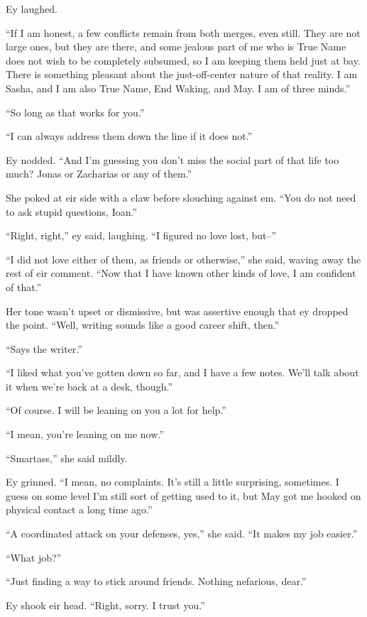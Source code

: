 Ey laughed.

``If I am honest, a few conflicts remain from both merges, even still. They are not large ones, but they are there, and some jealous part of me who is True Name does not wish to be completely subsumed, so I am keeping them held just at bay. There is something pleasant about the just-off-center nature of that reality. I am Sasha, and I am also True Name, End Waking, and May. I am of three minds.''

``So long as that works for you.''

``I can always address them down the line if it does not.''

Ey nodded. ``And I'm guessing you don't miss the social part of that life too much? Jonas or Zacharias or any of them.''

She poked at eir side with a claw before slouching against em. ``You do not need to ask stupid questions, Ioan.''

``Right, right,'' ey said, laughing. ``I figured no love lost, but--''

``I did not love either of them, as friends or otherwise,'' she said, waving away the rest of eir comment. ``Now that I have known other kinds of love, I am confident of that.''

Her tone wasn't upset or dismissive, but was assertive enough that ey dropped the point. ``Well, writing sounds like a good career shift, then.''

``Says the writer.''

``I liked what you've gotten down so far, and I have a few notes. We'll talk about it when we're back at a desk, though.''

``Of course. I will be leaning on you a lot for help.''

``I mean, you're leaning on me now.''

``Smartass,'' she said mildly.

Ey grinned. ``I mean, no complaints. It's still a little surprising, sometimes. I guess on some level I'm still sort of getting used to it, but May got me hooked on physical contact a long time ago.''

``A coordinated attack on your defenses, yes,'' she said. ``It makes my job easier.''

``What job?''

``Just finding a way to stick around friends. Nothing nefarious, dear.''

Ey shook eir head. ``Right, sorry. I trust you.''

